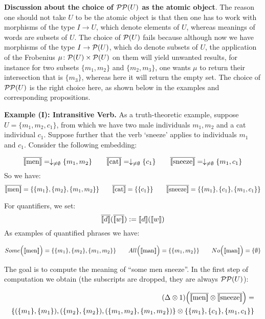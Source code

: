\bigskip
\noindent
{\bf Discussion about the choice of ${\cal P}{\cal P}(U)$ as the atomic object}. The reason one should not take $U$ to be the atomic object is that then one has to work with morphisms of the type $I \to U$, which denote elements of $U$, whereas meanings of words are subsets of $U$. The choice of ${\cal P}(U)$ fails because although now we have morphisms of the type $I \to {\cal P}(U)$, which do denote subsets of $U$, the application of the Frobenius $\mu \colon {\cal P}(U) \times {\cal P}(U)$ on them will yield unwanted results, for instance for two subsets $\{m_1, m_2\}$ and $\{m_2, m_3\}$, one wants $\mu$ to return their intersection that is $\{m_3\}$, whereas here it will return the empty set. The choice of ${\cal P}{\cal P}(U)$ is the right choice here, as shown below in the examples and corresponding propositions.   




\bigskip
\bigskip
\noindent
{\bf Example (I): Intransitive Verb.} As a truth-theoretic  example,  suppose $U = \{m_1, m_2, c_1\}$, from which we have two male individuals $m_1, m_2$  and a cat   individual $c_1$.  Suppose further that  the verb `sneeze'  applies to individuals $m_1$ and $c_1$. Consider the following embedding:

\[
\overline{[\![ \text{men} ]\!]} =  \downarrow_{\neq \emptyset}\{m_1, m_2\}  \qquad
\overline{[\![ \text{cat} ]\!]} =  \downarrow_{\neq \emptyset}\{c_1\}  \qquad
\overline{[\![ \text{sneeze} ]\!]} = \downarrow_{\neq \emptyset}\{m_1, c_1\}
\]
So we have:
\[
\overline{[\![ \text{men} ]\!]} =  \{\{m_1\}, \{m_2\}, \{m_1, m_2\}\}  \qquad
\overline{[\![ \text{cat} ]\!]} =  \{\{c_1\}\}  \qquad
\overline{[\![ \text{sneeze} ]\!]} = \{\{m_1\}, \{c_1\}, \{m_1, c_1\}\}
\]

\noindent
For  quantifiers, we set:
\[
\overline{\semantics{d}}  (\overline{\semantics{w}})  :=  \semantics{d}(\semantics{w}) 
\]
As examples of quantified phrases we have:

\[
Some\Big({[\![ \text{men} ]\!]}\Big) =  \{\{m_1\}, \{m_2\}, \{m_1, m_2\}\} \qquad
All\Big({[\![ \text{man} ]\!]}\Big) = \{\{m_1, m_2\}\} \qquad 
No\Big({[\![ \text{man} ]\!]}\Big) = \{\emptyset\} 
\]

\noindent
The goal is to compute the meaning of  ``some men sneeze''. In the first step of computation we obtain (the subscripts are dropped,  they are always ${\cal P}{\cal P}(U)$):

\begin{align*}
(\Delta \otimes 1)\Big(\overline{[\![ \text{men} ]\!]} \otimes \overline{[\![ \text{sneeze} ]\!]}\Big) =&\\
  \{(\{m_1\}, \{m_1\}), (\{m_2\}, \{m_2\}), (\{m_1, m_2\}, \{m_1, m_2\}) \} \otimes  \{\{m_1\}, \{c_1\}, \{m_1, c_1\}\} 
\end{align*}


